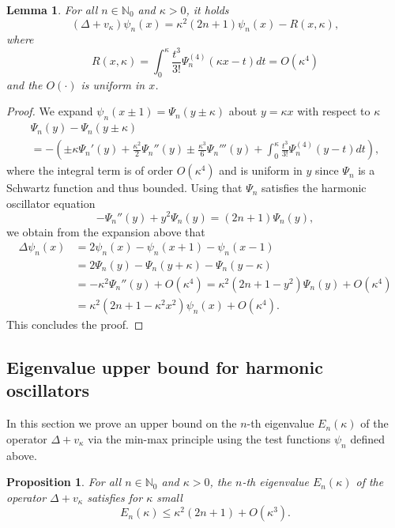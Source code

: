 \documentclass[12pt, reqno]{amsart}
\newtheorem{lemma}[theorem]{Lemma}
\newtheorem{proposition}[theorem]{Proposition}
\theoremstyle{definition}
\numberwithin{equation}{section}
\begin{document}
\begin{lemma}\label{lem:approx_eigenfunction}
For all $n \in \mathbb{N}_0$ and $\kappa>0$, it holds
$$(\Delta+v_\kappa)\psi_{n}(x)= \kappa^2 \left(2n+1\right)   \psi_{n}(x)-R(x,\kappa) ,$$
where 
$$R(x,\kappa)=\int_0^\kappa \frac{t^3}{3!} \Psi_{n}^{(4)}(\kappa x-t) dt= O(\kappa^4 )$$
and the $O(\cdot)$ is uniform in $x$. 
\end{lemma}
\begin{proof}
  We expand $\psi_{n}(x\pm 1)= \Psi_{n}(y\pm\kappa)$ about $y=\kappa x$ with respect to $\kappa$
    \begin{multline*}
         \Psi_{n}(y)-\Psi_{n}(y\pm\kappa)\\
         = -\left(\pm \kappa \Psi_{n}'(y)+\frac{\kappa^2}{2}\Psi_{n}''(y)\pm\frac{\kappa^3}{6}\Psi_{n}'''(y)+\int_0^\kappa \frac{t^3}{3!}\Psi_{n}^{(4)}(y-t) dt \right),
    \end{multline*}
    where the integral term is of order $O(\kappa^4)$ and is uniform in $y$ since $\Psi_n$ is a Schwartz function and thus bounded.
    Using that $\Psi_n$ satisfies the harmonic oscillator equation \cite[Section~8.3]{Teschl}
    $$- \Psi_n''(y)+ {y^2} \Psi_n(y)=\left(2n+1\right)\Psi_n(y),$$
    we obtain from the expansion above that
    \begin{align*}
        \Delta \psi_{n}(x)&=  2\psi_{n}(x)-\psi_{n}(x+1)-\psi_{n}(x-1)\\
        &=2\Psi_{n}(y)-\Psi_{n}(y+\kappa)-\Psi_{n}(y-\kappa) \\
        &= - {\kappa^2} \Psi_{n}''(y)+O(\kappa^4 ) 
        = \kappa^2\left(  2n+1  -  {y^2} \right)  \Psi_{n}(y)+O(\kappa^4 )\\
        &= \kappa^2 \left(2n+1 - {\kappa^2 x^2} \right)  \psi_{n}(x)+O(\kappa^4 ).
    \end{align*}
This concludes the proof.
\end{proof}



\subsection{Eigenvalue upper bound for  harmonic oscillators}
In this section we prove an upper bound on the $n$-th eigenvalue $E_n(\kappa)$ of the operator $\Delta + v_\kappa$ via the min-max principle  using the test functions $\psi_n$   defined above.

\begin{proposition}\label{thm:upperbound}
    For all $n\in \mathbb{N}_0$ and $\kappa>0$,   the $n$-th eigenvalue $E_n(\kappa)$ of the operator $\Delta + v_\kappa$ satisfies for  $\kappa$ small 
    $$E_n(\kappa) \leq  \kappa^2 (2n+1) + O(\kappa^3).$$
\end{proposition}
\end{document}
